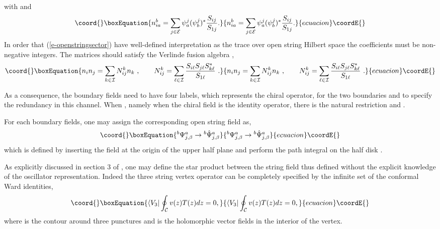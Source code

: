 \documentclass[a4paper,12pt]{article}
\begin{document}
with \coordHE{} and
\begin{equation}\coord{}\boxEquation{
 n_{ia}^b=\sum_{j\in \cal E} \psi^j_a (\psi^j_b)^* 
\frac{S_{ij}}{S_{1j}}.
}{
 n_{ia}^b=\sum_{j\in \cal E} \psi^j_a (\psi^j_b)^* 
\frac{S_{ij}}{S_{1j}}.
}{ecuacion}\coordE{}\end{equation}
In order that (\ref{e-openstringsector}) have 
well-defined interpretation as the trace over open string
Hilbert space the coefficients \coordHE{} must be
non-negative integers.  
The matrices \coordHE{} 
should satisfy the Verlinde fusion algebra \cite{r-Verlinde},
\begin{equation}\coord{}\boxEquation{
 n_i n_j = \sum_{k\in\cal I} N_{ij}^k n_k\,\,,
\qquad
N_{ij}^k=\sum_{\ell\in \cal I}\frac{S_{i\ell}
S_{j\ell}S_{k\ell}^*}{S_{1\ell}}\,\,.
}{
 n_i n_j = \sum_{k\in\cal I} N_{ij}^k n_k\,\,,
\qquad
N_{ij}^k=\sum_{\ell\in \cal I}\frac{S_{i\ell}
S_{j\ell}S_{k\ell}^*}{S_{1\ell}}\,\,.
}{ecuacion}\coordE{}\end{equation}


As a consequence, the boundary fields 
\coordHE{} need to have
four labels,  \coordHE{} which represents the chiral
operator, \coordHE{} for the two boundaries and 
\coordHE{} to specify the redundancy in
this channel.  When \coordHE{}, namely when the chiral
field is the identity operator, there is the natural
restriction \coordHE{} and \coordHE{}.

For each boundary fields, one may assign the corresponding
open string field as,
\begin{equation}\coord{}\boxEquation{
 {}^b\Psi^a_{j,\beta}\rightarrow {}^b{\hat\Psi}^a_{j,\beta}
}{
 {}^b\Psi^a_{j,\beta}\rightarrow {}^b{\hat\Psi}^a_{j,\beta}
}{ecuacion}\coordE{}\end{equation}
which is defined by inserting the field \coordHE{}
at the origin of the upper half plane 
and perform the path integral on the half disk
\cite{r-Witten}.

As explicitly discussed in section 3 of \cite{r-RZ}, one may define
the star product between the string field thus defined without
the explicit knowledge of the oscillator representation.
Indeed the three string vertex operator can be completely specified
by the infinite set of the conformal Ward identities,
\begin{equation}\coord{}\boxEquation{
 \langle V_3 | \oint_{\cal C}v(z) T(z)dz=0,
}{
 \langle V_3 | \oint_{\cal C}v(z) T(z)dz=0,
}{ecuacion}\coordE{}\end{equation}
where \coordHE{}  is
the contour around three punctures and \coordHE{} is the 
holomorphic vector fields in the interior of the vertex.
\end{document}
